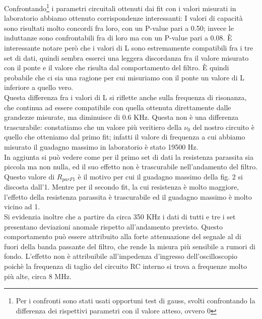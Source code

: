 \documentclass[9pt,a4paper,twocolumn,twoside]{tau-class/tau}
\begin{document}
Confrontando\footnote{Per i confronti sono stati usati opportuni test di gauss, svolti confrontando la differenza dei rispettivi parametri con il valore atteso, ovvero 0} i parametri circuitali ottenuti dai fit con i valori misurati in laboratorio abbiamo ottenuto corrispondenze interessanti: I valori di capacità sono risultati molto concordi fra loro, con un P-value pari a 0.50; invece le induttanze sono confrontabili fra di loro ma con un P-value pari a 0.08.
\`E interessante notare però che i valori di L sono estremamente compatibili fra i tre set di dati, quindi sembra esserci una leggera discordanza fra il valore misurato con il ponte e il valore che risulta dal comportamento del filtro. \`E quindi probabile che ci sia una ragione per cui misuriamo con il ponte un valore di L inferiore a quello vero.\\ 

Questa differenza fra i valori di L si riflette anche sulla frequenza di risonanza, che continua ad essere compatibile con quella ottenuta direttamente dalle grandezze misurate, ma diminuisce di 0.6 KHz. Questa non è una differenza trascurabile: constatiamo che un valore più veritiero della $\nu_0$ del nostro circuito è quello che otteniamo dal primo fit; infatti il valore di frequenza a cui abbiamo misurato il guadagno massimo in laboratorio è stato 19500 Hz. \\
In aggiunta si può vedere come per il primo set di dati la resistenza parassita sia piccola ma non nulla, ed il suo effetto non è trascurabile nell'andamento del filtro. Questo valore di $R_{parF1}$ è il motivo per cui il guadagno massimo della fig. 2 si discosta dall'1. Mentre per il secondo fit, la cui resistenza è molto maggiore, l'effetto della resistenza parassita è trascurabile ed il guadagno massimo è molto vicino ad 1.\\

Si evidenzia inoltre che a partire da circa 350 KHz i dati di tutti e tre i set presentano deviazioni anomale rispetto all'andamento previsto. Questo comportamento può essere attribuito alla forte attenuazione del segnale al di fuori della banda passante del filtro, che rende la misura più sensibile a rumori di fondo. L'effetto non è attribuibile all'impedenza d'ingresso dell'oscilloscopio poichè la frequenza di taglio del circuito RC interno si trova a frequenze molto più alte, circa 8 MHz.\\
\end{document}
